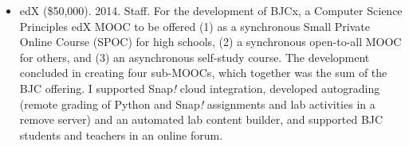 \begin{itemize}
    \item{edX (\$50,000). 2014. Staff.}
    \newline\small{For the development of BJCx, a Computer Science Principles edX MOOC to be offered (1) as a synchronous Small Private Online Course (SPOC) for high schools, (2) a synchronous open-to-all MOOC for others, and (3) an asynchronous self-study course. The development concluded in creating four sub-MOOCs, which together was the sum of the BJC offering. I supported Snap\textit{!} cloud integration, developed autograding (remote grading of Python and Snap\textit{!} assignments and lab activities in a remove server) and an automated lab content builder, and supported BJC students and teachers in an online forum.}

\end{itemize}

